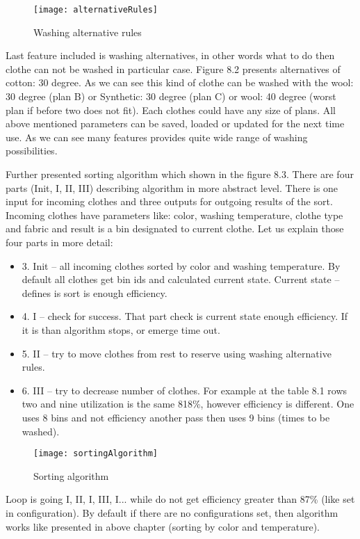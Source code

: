 \begin{figure}[h]
	\centering
		\texttt{[image: alternativeRules]}
	\caption{Washing alternative rules}
	\label{fig:planning}
\end{figure}

Last feature included is washing alternatives, in other words what to do then clothe can not be washed in particular case. Figure 8.2 presents alternatives of cotton: 30 degree. As we can see this kind of clothe can be washed with the wool: 30 degree (plan B) or Synthetic: 30 degree (plan C) or wool: 40 degree (worst plan if before two does not fit). Each clothes could have any size of plans. All above mentioned parameters can be saved, loaded or updated for the next time use. As we can see many features provides quite wide range of washing possibilities.

Further presented sorting algorithm which shown in the figure 8.3. There are four parts (Init, I, II, III) describing algorithm in more abstract level. There is one input for incoming clothes and three outputs for outgoing results of the sort. Incoming clothes have parameters like: color, washing temperature, clothe type and fabric and result is a bin designated to current clothe.  Let us explain those four parts in more detail:

\begin{itemize}
	\item 3. Init – all incoming clothes sorted by color and washing temperature. By default all clothes get bin ids and calculated current state. Current state – defines is sort is enough efficiency.
	\item 4. I – check for success. That part check is current state enough efficiency. If it is than algorithm stops, or emerge time out.
	\item 5. II – try to move clothes from rest to reserve using washing alternative rules. 
	\item 6. III – try to decrease number of clothes. For example at the table 8.1 rows two and nine utilization is the same 818\%, however efficiency is different. One uses 8 bins and not efficiency another pass then uses 9 bins (times to be washed).
\end{itemize}

\begin{figure}[h]
	\centering
		\texttt{[image: sortingAlgorithm]}
	\caption{Sorting algorithm}
	\label{fig:planning}
\end{figure}

Loop is going I, II, I, III, I... while do not get efficiency greater than 87\% (like set in configuration). By default if there are no configurations set, then algorithm works like presented in above chapter (sorting by color and temperature).

